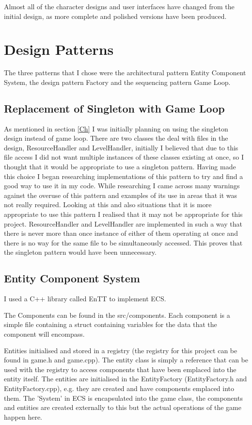 \documentclass{article}
\begin{document}
Almost all of the character designs and user interfaces have changed from the initial design, as more complete and polished versions have been produced.

\section{Design Patterns} 
\label{DP}

The three patterns that I chose were the architectural pattern Entity Component System, the design pattern Factory and the sequencing pattern Game Loop. 

\subsection{Replacement of Singleton with Game Loop}

As mentioned in section \ref{Ch} I was initially planning on using the singleton design instead of game loop. 
There are two classes the deal with files in the design, ResourceHandler and LevelHandler, 
initially I believed that due to this file access I did not want multiple instances of these classes existing at once, so I thought that it would be appropriate to use a singleton pattern.
Having made this choice I began researching implementations of this pattern to try and find a good way to use it in my code.
While researching I came across many warnings against the overuse of this pattern and examples of its use in areas that it was not really required. 
Looking at this and also situations that it is more appropriate to use this pattern I realised that it may not be appropriate for this project.
ResourceHandler and LevelHandler are implemented in such a way that there is never more than once instance of either of them operating at once and there is no way for the same file to be simultaneously accessed.
This proves that the singleton pattern would have been unnecessary.

\subsection{Entity Component System}

I used a C++ library called EnTT to implement ECS.

The Components can be found in the src/components. Each component is a simple file containing a struct containing variables for the data that the component will encompass.

Entities initialised and stored in a registry (the registry for this project can be found in game.h and game.cpp).
The entity class is simply a reference that can be used with the registry to access components that have been emplaced into the entity itself.
The entities are initialised in the EntityFactory (EntityFactory.h and EntityFactory.cpp), e.g. they are created and have components emplaced into them.
The 'System' in ECS is encapsulated into the game class, the components and entities are created externally to this but the actual operations of the game happen here.
\end{document}
